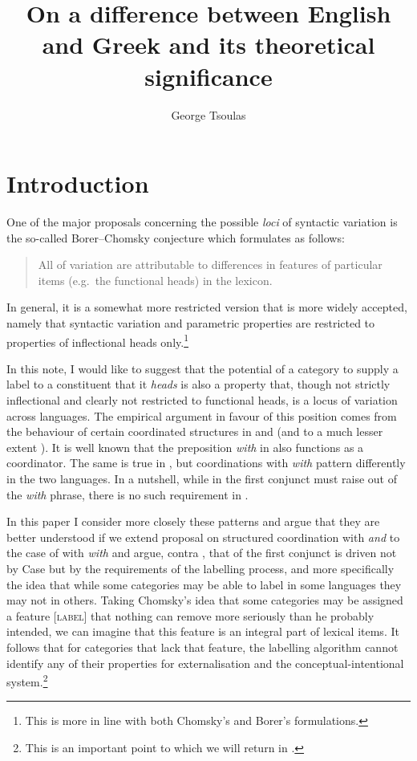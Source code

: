 \documentclass[output=paper]{langsci/langscibook}
\author{George Tsoulas\affiliation{University of York}}
\title{On a difference between English and Greek and its theoretical significance}
\begin{document}
\glsresetall

\section{Introduction}

One of the major proposals concerning the possible \emph{loci} of syntactic
variation is the so-called Borer--Chomsky conjecture
which \citet{Baker2008b} formulates as follows:

\begin{quote}
All  of variation are attributable to differences in features of
particular items (e.g.\ the functional heads) in the lexicon.
\end{quote}

In general, it is a somewhat more restricted version that is more widely
accepted, namely that syntactic variation and parametric properties are
restricted to properties of inflectional heads only.\footnote{This is more in
line with both Chomsky's and Borer's formulations.}

In this note, I would like to suggest that the potential of a category to
supply a label to a constituent that it \emph{heads} is also a property that,
though not strictly inflectional and clearly not restricted to functional
heads, is a locus of variation across languages. The empirical argument in
favour of this position comes from the behaviour of certain coordinated
structures in  and  (and to a much lesser extent
). It is well known that the preposition \emph{with} in
 also functions as a coordinator. The same is true in ,
but coordinations with \emph{with} pattern differently in the two languages. In
a nutshell, while in  the first conjunct must raise out of the
\emph{with} phrase, there is no such requirement in .

In this paper I consider more closely these patterns and argue that they are
better understood if we extend  proposal on structured
coordination with \emph{and} to the case of  with \emph{with}
and argue, contra \citet{Kayne1994}, that  of the first
conjunct is driven not by Case but by the requirements of the
labelling process, and more specifically the idea that while some
categories may be able to label in some languages they may not in others.
Taking Chomsky's idea that some categories may be assigned a feature [\textsc{label}]
that nothing can remove more seriously than he probably intended, we can
imagine that this feature is an integral part of lexical items. It follows that
for categories that lack that feature, the labelling algorithm cannot identify
any of their properties for externalisation and the conceptual-intentional
system.\footnote{This is an important point to which we will return in
.}
\end{document}
